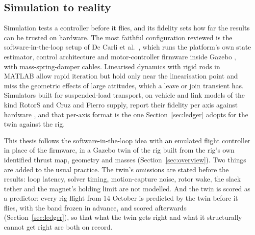 
\subsection{Simulation to reality}
\label{sec:lit_sim}

Simulation tests a controller before it flies, and its fidelity sets how far the results can be trusted on
hardware. The most faithful configuration reviewed is the software-in-the-loop setup of De Carli et al.\
\cite{distributedNMPC}, which runs the platform's own state estimator, control architecture and motor-controller
firmware inside Gazebo \cite{koenig2004gazebo}, with mass-spring-damper cables. Linearised dynamics with rigid
rods in MATLAB \cite{DistributedMPC} allow rapid iteration but hold only near the linearisation point and miss the
geometric effects of large attitudes, which a leave or join transient has. Simulators built for suspended-load
transport, on vehicle and link models of the kind RotorS \cite{furrer2016rotors} and Cruz and Fierro
\cite{cruz2017cable} supply, report their fidelity per axis against hardware \cite{li2024rotortm}, and that per-axis
format is the one Section~\ref{sec:ledger} adopts for the twin against the rig.

This thesis follows the software-in-the-loop idea with an emulated flight controller in place of the firmware,
in a Gazebo twin of the rig built from the rig's own identified thrust map, geometry and masses
(Section~\ref{sec:overview}). Two things are added to the usual practice. The twin's omissions are stated before
the results: loop latency, solver timing, motion-capture noise, rotor wake, the slack tether and the magnet's
holding limit are not modelled. And the twin is scored as a predictor: every rig flight from 14 October is
predicted by the twin before it flies, with the band frozen in advance, and scored afterwards
(Section~\ref{sec:ledger}), so that what the twin gets right and what it structurally cannot get right are both
on record.
